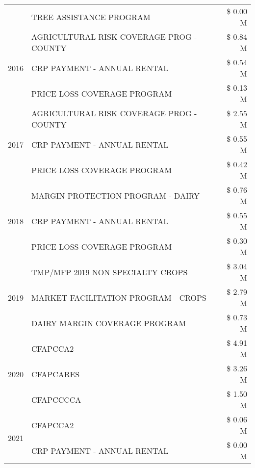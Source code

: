\begin{tabular}{llr}
 & TREE ASSISTANCE PROGRAM & \$ 0.00 M \\
\cline{1-3}
\multirow[t]{3}{*}{2016} & AGRICULTURAL RISK COVERAGE PROG - COUNTY & \$ 0.84 M \\
 & CRP PAYMENT - ANNUAL RENTAL & \$ 0.54 M \\
 & PRICE LOSS COVERAGE PROGRAM & \$ 0.13 M \\
\cline{1-3}
\multirow[t]{3}{*}{2017} & AGRICULTURAL RISK COVERAGE PROG - COUNTY & \$ 2.55 M \\
 & CRP PAYMENT - ANNUAL RENTAL & \$ 0.55 M \\
 & PRICE LOSS COVERAGE PROGRAM & \$ 0.42 M \\
\cline{1-3}
\multirow[t]{3}{*}{2018} & MARGIN PROTECTION PROGRAM - DAIRY & \$ 0.76 M \\
 & CRP PAYMENT - ANNUAL RENTAL & \$ 0.55 M \\
 & PRICE LOSS COVERAGE PROGRAM & \$ 0.30 M \\
\cline{1-3}
\multirow[t]{3}{*}{2019} & TMP/MFP 2019 NON SPECIALTY CROPS & \$ 3.04 M \\
 & MARKET FACILITATION PROGRAM - CROPS & \$ 2.79 M \\
 & DAIRY MARGIN COVERAGE PROGRAM & \$ 0.73 M \\
\cline{1-3}
\multirow[t]{3}{*}{2020} & CFAPCCA2 & \$ 4.91 M \\
 & CFAPCARES & \$ 3.26 M \\
 & CFAPCCCCA & \$ 1.50 M \\
\cline{1-3}
\multirow[t]{2}{*}{2021} & CFAPCCA2 & \$ 0.06 M \\
 & CRP PAYMENT - ANNUAL RENTAL & \$ 0.00 M \\
\cline{1-3}
\bottomrule
\end{tabular}
